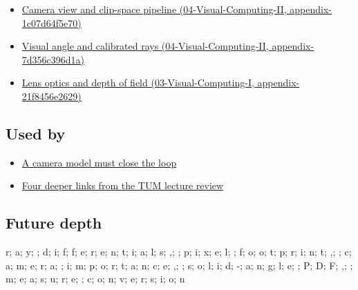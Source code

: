 \begin{itemize}
\tightlist
\item
  \href{../04-Visual-Computing-II/main.pdf\#nameddest=appendix-1c07d64f5e70}{Camera view and clip-space pipeline (04-Visual-Computing-II, appendix-1c07d64f5e70)}
\item
  \href{../04-Visual-Computing-II/main.pdf\#nameddest=appendix-7d356c396d1a}{Visual angle and calibrated rays (04-Visual-Computing-II, appendix-7d356c396d1a)}
\item
  \href{../03-Visual-Computing-I/main.pdf\#nameddest=appendix-21f8456e2629}{Lens optics and depth of field (03-Visual-Computing-I, appendix-21f8456e2629)}
\end{itemize}

\subsection{Used by}\label{appendix-8c40fad29462-used-by}

\begin{itemize}
\tightlist
\item
  \hyperref[02-foundations-ii-ch037-a-camera-model-must-close-the-loop]{A camera model must close the loop}
\item
  \hyperref[02-foundations-ii-ch036-four-deeper-links-from-the-tum-lecture-review]{Four deeper links from the TUM lecture review}
\end{itemize}

\subsection{Future depth}\label{appendix-8c40fad29462-future-depth}

r; a; y; ; d; i; f; f; e; r; e; n; t; i; a; l; s; ,; ; p; i; x; e; l; ; f; o; o; t; p; r; i; n; t; ,; ; c; a; m; e; r; a; ; i; m; p; o; r; t; a; n; c; e; ,; ; s; o; l; i; d; -; a; n; g; l; e; ; P; D; F; ,; ; m; e; a; s; u; r; e; ; c; o; n; v; e; r; s; i; o; n
